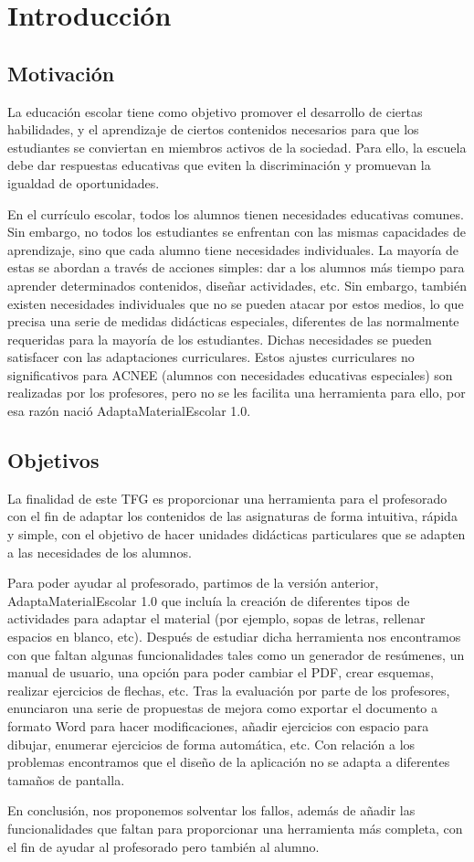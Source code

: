 \chapter{Introducción}
\label{cap:introduccion}

\section{Motivación}
La educación escolar tiene como objetivo promover el desarrollo de ciertas habilidades, y el aprendizaje de ciertos contenidos necesarios para que los estudiantes se conviertan en miembros activos de la sociedad. Para ello, la escuela debe dar respuestas educativas que eviten la discriminación y promuevan la igualdad de oportunidades.

En el currículo escolar, todos los alumnos tienen necesidades educativas comunes. Sin embargo, no todos los estudiantes se enfrentan con las mismas capacidades de aprendizaje, sino que cada alumno tiene necesidades individuales. La mayoría de estas se abordan a través de acciones simples: dar a los alumnos más tiempo para aprender determinados contenidos, diseñar actividades, etc.  Sin embargo, también existen necesidades individuales que no se pueden atacar por estos medios, lo que precisa una serie de medidas didácticas especiales, diferentes de las normalmente requeridas para la mayoría de los estudiantes. Dichas necesidades se pueden satisfacer con las adaptaciones curriculares. Estos ajustes curriculares no significativos para ACNEE (alumnos con necesidades educativas especiales) son realizadas por los profesores, pero no se les facilita una herramienta para ello, por esa razón nació AdaptaMaterialEscolar 1.0.

\section{Objetivos}
La finalidad de este TFG es proporcionar una herramienta para el profesorado con el fin de adaptar los contenidos de las asignaturas de forma intuitiva, rápida y simple, con el objetivo de hacer unidades didácticas particulares que se adapten a las necesidades de los alumnos.

Para poder ayudar al profesorado, partimos de la versión anterior, AdaptaMaterialEscolar 1.0 que incluía la creación de diferentes tipos de actividades para adaptar el material (por ejemplo, sopas de letras, rellenar espacios en blanco, etc). Después de estudiar dicha herramienta nos encontramos con que faltan algunas funcionalidades tales como un generador de resúmenes, un manual de usuario, una opción para poder cambiar el PDF, crear esquemas, realizar ejercicios de flechas, etc. Tras la evaluación por parte de los profesores, enunciaron una serie de propuestas de mejora como exportar el documento a formato Word para hacer modificaciones, añadir ejercicios con espacio para dibujar, enumerar ejercicios de forma automática, etc. Con relación a los problemas encontramos que el diseño de la aplicación no se adapta a diferentes tamaños de pantalla. 

En conclusión, nos proponemos solventar los fallos, además de añadir las funcionalidades que faltan para proporcionar una herramienta más completa, con el fin de ayudar al profesorado pero también al alumno. 

